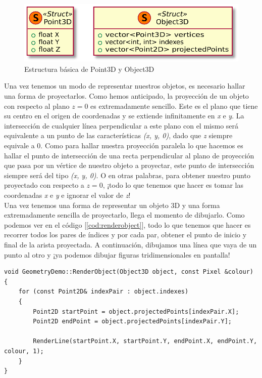 \begin{figure}[h]
	\centering
	\includegraphics[width=12cm]{archivos/pointandobject}
	\caption{Estructura básica de Point3D y Object3D}
	\label{fig:pointandobject}
\end{figure}

Una vez tenemos un modo de representar nuestros objetos, es necesario hallar una forma de proyectarlos. Como hemos anticipado, la proyección de un objeto con respecto al plano \(z = 0\) es extremadamente sencillo. Este es el plano que tiene su centro en el origen de coordenadas y se extiende infinitamente en \emph{x} e \emph{y}. La intersección de cualquier línea perpendicular a este plano con el mismo será equivalente a un punto de las características \emph{(x, y, 0)}, dado que \emph{z} siempre equivale a 0. Como para hallar nuestra proyección paralela lo que hacemos es hallar el punto de intersección de una recta perpendicular al plano de proyección que pasa por un vértice de nuestro objeto a proyectar, este punto de intersección siempre será del tipo \emph{(x, y, 0)}. O en otras palabras, para obtener nuestro punto proyectado con respecto a \(z = 0\), ¡todo lo que tenemos que hacer es tomar las coordenadas \emph{x} e \emph{y} e  ignorar el valor de \emph{z}!\\

Una vez tenemos una forma de representar un objeto 3D y una forma extremadamente sencilla de proyectarlo, llega el momento de dibujarlo. Como podemos ver en el código [\ref{cod:renderobject}], todo lo que tenemos que hacer es recorrer todos los pares de índices y por cada par, obtener el punto de inicio y final de la arista proyectada. A continuación, dibujamos una línea que vaya de un punto al otro y ¡ya podemos dibujar figuras tridimensionales en pantalla!\\


\begin{lstlisting}[style=C-color, caption={Código para dibujar un objeto 3D}, label=cod:renderobject]
void GeometryDemo::RenderObject(Object3D object, const Pixel &colour)
{
    for (const Point2D& indexPair : object.indexes)
    {
        Point2D startPoint = object.projectedPoints[indexPair.X];
        Point2D endPoint = object.projectedPoints[indexPair.Y];

        RenderLine(startPoint.X, startPoint.Y, endPoint.X, endPoint.Y, colour, 1);
    }
}
\end{lstlisting}

